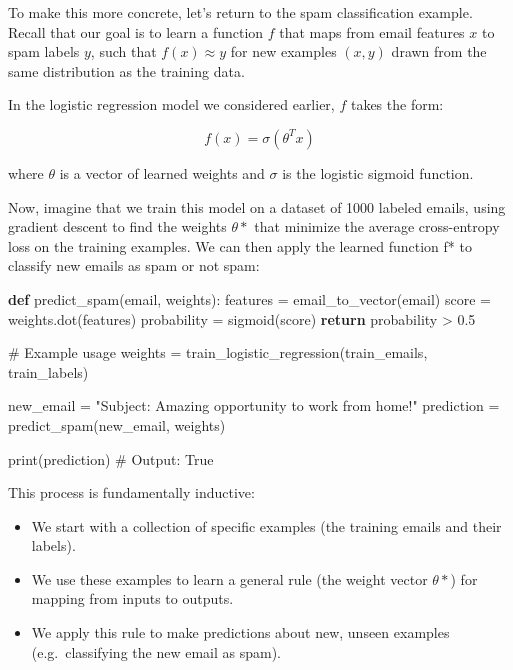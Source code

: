 \documentclass[
  9pt,
  letterpaper,
  abstract,
  titlepage]{scrbook}
\newenvironment{Shaded}{\begin{snugshade}}{\end{snugshade}}
\newcommand{\BuiltInTok}[1]{\textcolor[rgb]{0.00,0.23,0.31}{#1}}
\newcommand{\CommentTok}[1]{\textcolor[rgb]{0.37,0.37,0.37}{#1}}
\newcommand{\ControlFlowTok}[1]{\textcolor[rgb]{0.00,0.23,0.31}{\textbf{#1}}}
\newcommand{\FloatTok}[1]{\textcolor[rgb]{0.68,0.00,0.00}{#1}}
\newcommand{\KeywordTok}[1]{\textcolor[rgb]{0.00,0.23,0.31}{\textbf{#1}}}
\newcommand{\NormalTok}[1]{\textcolor[rgb]{0.00,0.23,0.31}{#1}}
\newcommand{\OperatorTok}[1]{\textcolor[rgb]{0.37,0.37,0.37}{#1}}
\newcommand{\StringTok}[1]{\textcolor[rgb]{0.13,0.47,0.30}{#1}}
\begin{document}
To make this more concrete, let's return to the spam classification
example. Recall that our goal is to learn a function \(f\) that maps
from email features \(x\) to spam labels \(y\), such that \(f(x) ≈ y\)
for new examples \((x,y)\) drawn from the same distribution as the
training data.

In the logistic regression model we considered earlier, \(f\) takes the
form:

\[f(x) = σ(θ^T x)\]

where \(θ\) is a vector of learned weights and \(σ\) is the logistic
sigmoid function.

Now, imagine that we train this model on a dataset of 1000 labeled
emails, using gradient descent to find the weights \(θ*\) that minimize
the average cross-entropy loss on the training examples. We can then
apply the learned function f* to classify new emails as spam or not
spam:

\begin{Shaded}
\begin{Highlighting}[]
\KeywordTok{def}\NormalTok{ predict\_spam(email, weights):}
\NormalTok{    features }\OperatorTok{=}\NormalTok{ email\_to\_vector(email)}
\NormalTok{    score }\OperatorTok{=}\NormalTok{ weights.dot(features)}
\NormalTok{    probability }\OperatorTok{=}\NormalTok{ sigmoid(score)}
    \ControlFlowTok{return}\NormalTok{ probability }\OperatorTok{\textgreater{}} \FloatTok{0.5}
    
\CommentTok{\# Example usage}
\NormalTok{weights }\OperatorTok{=}\NormalTok{ train\_logistic\_regression(train\_emails, train\_labels)}

\NormalTok{new\_email }\OperatorTok{=} \StringTok{"Subject: Amazing opportunity to work from home!"}
\NormalTok{prediction }\OperatorTok{=}\NormalTok{ predict\_spam(new\_email, weights)}

\BuiltInTok{print}\NormalTok{(prediction)  }\CommentTok{\# Output: True}
\end{Highlighting}
\end{Shaded}

This process is fundamentally inductive:

\begin{itemize}
\item
  We start with a collection of specific examples (the training emails
  and their labels).
\item
  We use these examples to learn a general rule (the weight vector
  \(θ*\)) for mapping from inputs to outputs.
\item
  We apply this rule to make predictions about new, unseen examples
  (e.g.~classifying the new email as spam).
\end{itemize}
\end{document}

